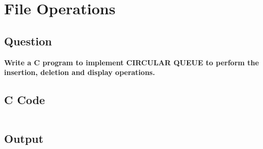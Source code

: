 \chapter{File Operations}
\section*{Question}
{\selectfont \textbf{Write a C program to implement CIRCULAR QUEUE to perform the insertion, deletion and display operations.
}}

\section*{C Code}

\begin{Verbatim}

\end{Verbatim}

\section*{Output}
\begin{Verbatim}



\end{Verbatim}

